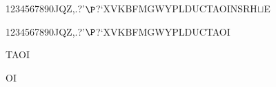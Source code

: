 \documentclass[12pt]{article}
\begin{document}
\begin{tt}
\begin{small}
\begin{bundle}{}
{\begin{bundle}{1234567890JQZ,.?'$\P$?`XVKBFMGWYPLDUCTAOINSRH$\sqcup$E}
{\begin{bundle}{1234567890JQZ,.?'$\P$?`XVKBFMGWYPLDUCTAOI}
{\begin{bundle}{TAOI}
{\begin{bundle}{OI}
\end{bundle}}
\end{bundle}}
\end{bundle}}
\end{bundle}}
\end{bundle}
\end{small}
\end{tt}
\newpage%
\end{document}
